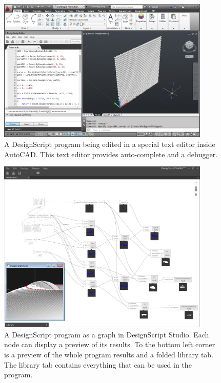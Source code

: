 \begin{figure}
	\centering
	\includegraphics[width=0.9\textwidth]{images/ds_autocad}
	\caption[A DesignScript program being edited in a special text editor inside AutoCAD.]{A DesignScript program being edited in a special text editor inside AutoCAD. This text editor provides auto-complete and a debugger.}
	\label{fig:ds:autocad}
\end{figure}

\begin{figure}
	\centering
	\includegraphics[width=0.9\textwidth]{images/ds_dsstudio}
	\caption[A DesignScript program as a graph in DesignScript Studio.]{A DesignScript program as a graph in DesignScript Studio. Each node can display a preview of its results. To the bottom left corner is a preview of the whole program results and a folded library tab. The library tab contains everything that can be used in the program.}
	\label{fig:ds:dsstudio}
\end{figure}

